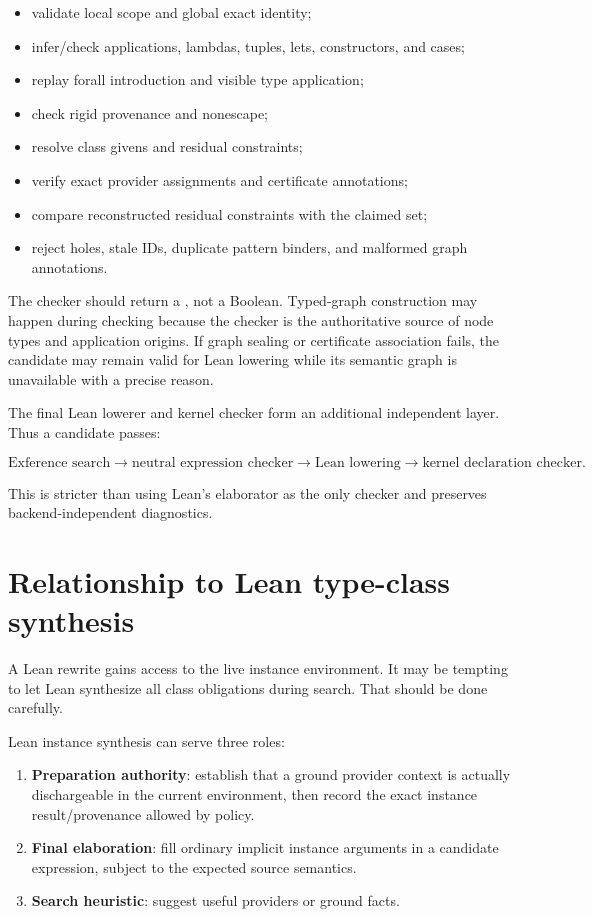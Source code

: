 \documentclass[10pt,letterpaper,oneside]{report}
\newcommand{\code}[1]{\texttt{\detokenize{#1}}}
\newcommand{\term}[1]{\textbf{#1}}
\begin{document}
\begin{itemize}
  \item validate local scope and global exact identity;
  \item infer/check applications, lambdas, tuples, lets, constructors, and cases;
  \item replay forall introduction and visible type application;
  \item check rigid provenance and nonescape;
  \item resolve class givens and residual constraints;
  \item verify exact provider assignments and certificate annotations;
  \item compare reconstructed residual constraints with the claimed set;
  \item reject holes, stale IDs, duplicate pattern binders, and malformed graph annotations.
\end{itemize}

The checker should return a \code{CheckedNeutralCandidate}, not a Boolean. Typed-graph construction may happen during checking because the checker is the authoritative source of node types and application origins. If graph sealing or certificate association fails, the candidate may remain valid for Lean lowering while its semantic graph is unavailable with a precise reason.

The final Lean lowerer and kernel checker form an additional independent layer. Thus a candidate passes:

\[
\text{Exference search}
\longrightarrow
\text{neutral expression checker}
\longrightarrow
\text{Lean lowering}
\longrightarrow
\text{kernel declaration checker}.
\]

This is stricter than using Lean's elaborator as the only checker and preserves backend-independent diagnostics.

\section{Relationship to Lean type-class synthesis}

A Lean rewrite gains access to the live instance environment. It may be tempting to let Lean synthesize all class obligations during search. That should be done carefully.

Lean instance synthesis can serve three roles:

\begin{enumerate}
  \item \term{Preparation authority}: establish that a ground provider context is actually dischargeable in the current environment, then record the exact instance result/provenance allowed by policy.
  \item \term{Final elaboration}: fill ordinary implicit instance arguments in a candidate expression, subject to the expected source semantics.
  \item \term{Search heuristic}: suggest useful providers or ground facts.
\end{enumerate}
\end{document}
